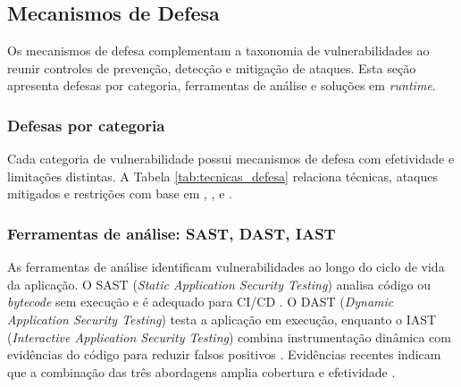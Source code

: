 \subsection{
    Mecanismos de Defesa
} \label{sec:mecanismos_defesa}

Os mecanismos de defesa complementam a taxonomia de vulnerabilidades ao reunir controles de prevenção, detecção e mitigação de ataques. Esta seção apresenta defesas por categoria, ferramentas de análise e soluções em \textit{runtime}.

\subsubsection{Defesas por categoria}

Cada categoria de vulnerabilidade possui mecanismos de defesa com efetividade e limitações distintas. A Tabela \ref{tab:tecnicas_defesa} relaciona técnicas, ataques mitigados e restrições com base em \cite{Halfond2006SQLInjectionClassification}, \cite{Gupta2015XSSAttacksDefense}, \cite{Barth2008RobustDefensesCSRF} e \cite{OWASP2021Top10}.

\begin{table}[htbp]
    \caption{Técnicas de defesa por categoria de ataque e limitações}
    \label{tab:tecnicas_defesa}
    
\end{table}

\subsubsection{Ferramentas de análise: SAST, DAST, IAST}

As ferramentas de análise identificam vulnerabilidades ao longo do ciclo de vida da aplicação. O SAST (\textit{Static Application Security Testing}) analisa código ou \textit{bytecode} sem execução e é adequado para CI/CD \cite{Alazmi2022WebScannerReview}. O DAST (\textit{Dynamic Application Security Testing}) testa a aplicação em execução, enquanto o IAST (\textit{Interactive Application Security Testing}) combina instrumentação dinâmica com evidências do código para reduzir falsos positivos \cite{Cotroneo2025IASTvsRASP}. Evidências recentes indicam que a combinação das três abordagens amplia cobertura e efetividade \cite{DeJesus2023SecurityTestingWebApps}.

\begin{table}[htbp]
    \caption{Comparativo SAST, DAST, IAST}
    \label{tab:comparativo_sast_dast_iast}
    
\end{table}

